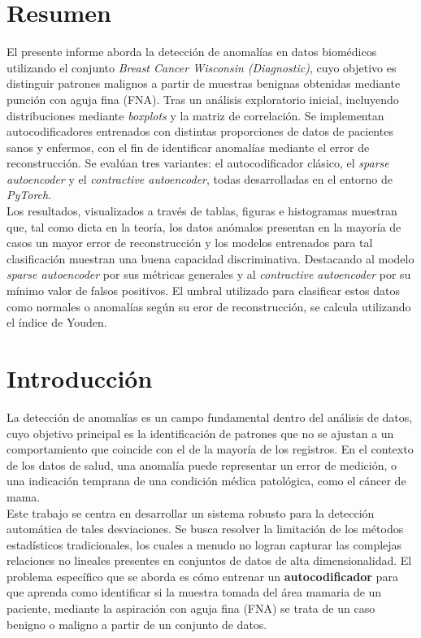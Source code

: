 \documentclass[a4paper,10pt]{book}
\begin{document}
\chapter*{Resumen}

El presente informe aborda la detección de anomalías en datos biomédicos utilizando el conjunto \emph{Breast Cancer Wisconsin (Diagnostic)}, cuyo objetivo es distinguir patrones malignos a partir de muestras benignas obtenidas mediante punción con aguja fina (FNA). Tras un análisis exploratorio inicial, incluyendo distribuciones mediante \emph{boxplots} y la matriz de correlación. Se implementan autocodificadores entrenados con distintas proporciones de datos de pacientes sanos y enfermos, con el fin de identificar anomalías mediante el error de reconstrucción. Se evalúan tres variantes: el autocodificador clásico, el \emph{sparse autoencoder} y el \emph{contractive autoencoder}, todas desarrolladas en el entorno de \emph{PyTorch}.\\

Los resultados, visualizados a través de tablas, figuras e histogramas muestran que, tal como dicta en la teoría, los datos anómalos presentan en la mayoría de casos un mayor error de reconstrucción y los modelos entrenados para tal clasificación muestran una buena capacidad discriminativa. Destacando al modelo \emph{sparse autoencoder} por sus métricas generales y al \emph{contractive autoencoder} por su mínimo valor de falsos positivos. El umbral utilizado para clasificar estos datos como normales o anomalías según su eror de reconstrucción, se calcula utilizando el índice de Youden.

\chapter{Introducción}

La detección de anomalías es un campo fundamental dentro del análisis de datos, cuyo objetivo principal es la identificación de patrones que no se ajustan a un comportamiento que coincide con el de la mayoría de los registros. En el contexto de los datos de salud, una anomalía puede representar un error de medición, o una indicación temprana de una condición médica patológica, como el cáncer de mama.\\

Este trabajo se centra en desarrollar un sistema robusto para la detección automática de tales desviaciones. Se busca resolver la limitación de los métodos estadísticos tradicionales, los cuales a menudo no logran capturar las complejas relaciones no lineales presentes en conjuntos de datos de alta dimensionalidad. El problema específico que se aborda es cómo entrenar un \textbf{autocodificador} para que aprenda como identificar si la muestra tomada del área mamaria de un paciente, mediante la aspiración con aguja fina (FNA) se trata de un caso benigno o maligno a partir de un conjunto de datos.
\end{document}
